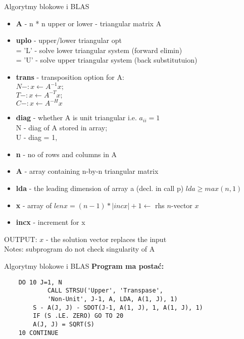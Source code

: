 	\begin{frame}[allowframebreaks]{Algorytmy blokowe i BLAS}
	\begin{itemize}
	\item \textbf{A} - n * n upper or lower - triangular matrix A \\
	\item \textbf{uplo} - upper/lower triangular opt \\
	= 'L' - solve lower triangular system (forward elimin) \\
	= 'U' - solve upper triangular system (back substitutuion) \\
	\item \textbf{trans} - transposition option for A: \\
	$N - : x \leftarrow A^{-1} x;$ \\
	$T - : x \leftarrow A^{-T} x;$ \\
	$C - : x \leftarrow A^{-H} x$ \\
	\item \textbf{diag} - whether A is unit triangular i.e. $a_{ii} = 1$ \\
	N - diag of A stored in array; \\
	U - diag = 1, \\
	\item \textbf{n} - no of rows and columns in A \\
	\item \textbf{A} - array containing n-by-n triangular matrix \\
	\item \textbf{lda} - the leading dimension of array a (decl. in call p) $lda \geq max(n, 1)$ \\ 
	\item \textbf{x} - array of $lenx = (n - 1) *  |incx| + 1 \leftarrow$ rhs $n$-vector $x$ \\
	\item \textbf{incx} - increment for x \\ 
	\end{itemize}
	OUTPUT:  $x$ - the solution vector replaces the input \\
	Notes: subprogram do not check singularity of A \\
	\end{frame}
	\begin{frame}[fragile]{Algorytmy blokowe i BLAS}
		\textbf{Program ma postać:}
		\begin{lstlisting}
    DO 10 J=1, N
            CALL STRSU('Upper', 'Transpase', 
            'Non-Unit', J-1, A, LDA, A(1, J), 1)
        S - A(J, J) - SDOT(J-1, A(1, J), 1, A(1, J), 1)
        IF (S .LE. ZERO) GO TO 20
        A(J, J) = SQRT(S)
    10 CONTINUE
		\end{lstlisting}
		
	\end{frame}
